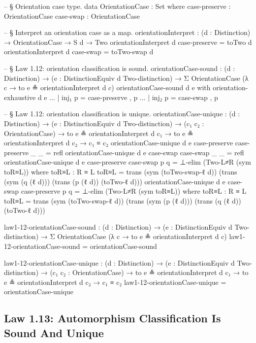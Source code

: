 \documentclass[11pt,a4paper]{book}
\begin{document}
\begin{code}
-- § Orientation case type.
data OrientationCase : Set where
  case-preserve : OrientationCase
  case-swap     : OrientationCase

-- § Interpret an orientation case as a map.
orientationInterpret : (d : Distinction) → OrientationCase → S d → Two
orientationInterpret d case-preserve = toTwo d
orientationInterpret d case-swap     = toTwo-swap d

-- § Law 1.12: orientation classification is sound.
orientationCase-sound :
  (d : Distinction) →
  (e : DistinctionEquiv d Two-distinction) →
  Σ OrientationCase (λ c → to e ≗ orientationInterpret d c)
orientationCase-sound d e with orientation-exhaustive d e
... | inj₁ p = case-preserve , p
... | inj₂ p = case-swap     , p

-- § Law 1.12: orientation classification is unique.
orientationCase-unique :
  (d : Distinction) →
  (e : DistinctionEquiv d Two-distinction) →
  (c₁ c₂ : OrientationCase) →
  to e ≗ orientationInterpret d c₁ →
  to e ≗ orientationInterpret d c₂ →
  c₁ ≡ c₂
orientationCase-unique d e case-preserve case-preserve _ _ = refl
orientationCase-unique d e case-swap     case-swap     _ _ = refl
orientationCase-unique d e case-preserve case-swap p q =
  ⊥-elim (Two-L≠R (sym toR≡L))
  where
    toR≡L : R ≡ L
    toR≡L =
      trans (sym (toTwo-swap-ℓ d))
        (trans (sym (q (ℓ d)))
          (trans (p (ℓ d)) (toTwo-ℓ d)))
orientationCase-unique d e case-swap case-preserve p q =
  ⊥-elim (Two-L≠R (sym toR≡L))
  where
    toR≡L : R ≡ L
    toR≡L =
      trans (sym (toTwo-swap-ℓ d))
        (trans (sym (p (ℓ d)))
          (trans (q (ℓ d)) (toTwo-ℓ d)))

law1-12-orientationCase-sound :
  (d : Distinction) →
  (e : DistinctionEquiv d Two-distinction) →
  Σ OrientationCase (λ c → to e ≗ orientationInterpret d c)
law1-12-orientationCase-sound = orientationCase-sound

law1-12-orientationCase-unique :
  (d : Distinction) →
  (e : DistinctionEquiv d Two-distinction) →
  (c₁ c₂ : OrientationCase) →
  to e ≗ orientationInterpret d c₁ →
  to e ≗ orientationInterpret d c₂ →
  c₁ ≡ c₂
law1-12-orientationCase-unique = orientationCase-unique
\end{code}

\subsection{Law 1.13: Automorphism Classification Is Sound And Unique}
\end{document}
